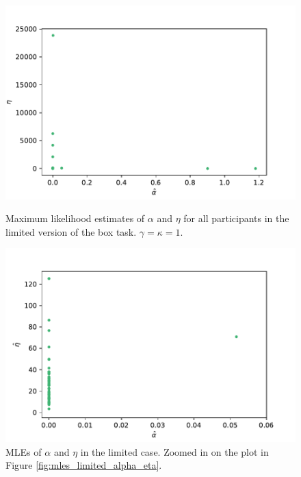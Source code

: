 \begin{figure}
    \centering
    \begin{minipage}{0.48\textwidth}
        \centering
        \includegraphics[scale=0.36]{pictures/plotted_mles_limited_alpha_eta_gk1.pdf}
        \caption[MLEs of $\alpha$ and $\eta$, limited. $\gamma=\kappa=1$]{Maximum likelihood estimates of $\alpha$ and $\eta$ for all participants in the limited version of the box task. $\gamma=\kappa=1$.}
        \label{fig:mles_limited_alpha_eta}
    \end{minipage}\hfill
    \begin{minipage}{0.48\textwidth}
        \centering
        \includegraphics[scale=0.36]{pictures/plotted_mles_limited_alpha_eta_gk1_zoomed.pdf}
        \caption[MLEs of $\alpha$ and $\eta$ zoomed, limited. $\gamma=\kappa=1$]{MLEs of $\alpha$ and $\eta$ in the limited case. Zoomed in on the plot in Figure \ref{fig:mles_limited_alpha_eta}.}
        \label{fig:mles_limited_alpha_eta_zoomed}
    \end{minipage}
\end{figure}


